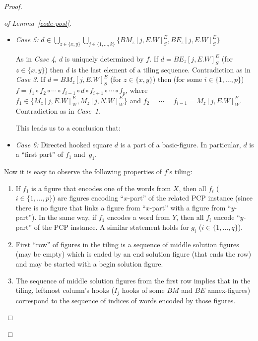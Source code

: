 \documentclass[final,nomarks]{dmtcs-episciences}
\newcommand{\NN}[1]{\{1,\ldots,#1\}}
\begin{document}
\begin{proof}
\begin{proof}[of Lemma~\ref{code-post}]
\begin{itemize}
Now $d$ must be the first one in the tiling since it has the
start point at its north side and it is the northernmost in the
tiling. Observe that there exists no square with $e$-hook at the
north side. Hence $BM_z[j,E.W]^N_E$ and $BE_z[j,E.W]^N_E$
($z\in\{x,y\}$) cannot be the first elements of two different
tiling sequences of $f$. Consequently, $d$ is uniquely
determined by $f$ and $d=f_1=g_1$. Contradiction as in
\emph{Case~2}.

\item\emph{Case 5:}
$d\in\bigcup_{z\in\{x,y\}}\bigcup_{j\in\NN{k}}\{
	BM_z[j,E.W]^E_S,
	BE_z[j,E.W]^E_S
\}$

As in \emph{Case 4}, $d$ is uniquely determined by $f$. If
$d=BE_z[j,E.W]^E_S$ (for $z\in\{x,y\}$) then $d$ is the last
element of a tiling sequence. Contradiction as in \emph{Case 3}.
If $d=BM_z[j,E.W]^E_S$ (for $z\in\{x,y\}$) then (for some
$i\in\NN{p}$) $f=f_1\circ f_2\circ\cdots\circ f_{i-1}\circ
d\circ f_{i+1}\circ\cdots\circ f_p$, where
$f_1\in\{M_z[j,E.W]^E_W,M_z[j,N.W]^E_W\}$ and
$f_2=\cdots=f_{i-1}=M_z[j,E.W]^E_W$. Contradiction as in
\emph{Case~1}.

This leads us to a conclusion that:

\item\emph{Case 6:} Directed hooked square $d$ is a part of a
basic-figure. In particular, $d$ is a ``first part'' of $f_1$
and~$g_1$.

\end{itemize}

Now it is easy to observe the following properties of $f$'s tiling:
\begin{enumerate}

\item If $f_1$ is a figure that encodes one of the words from $X$,
then all $f_i$ ($i\in\NN{p}$) are figures encoding
``$x$-part'' of the related PCP instance (since there is no figure
that links a figure from ``$x$-part'' with a
figure from ``$y$-part''). In the same way, if $f_1$ encodes a word
from $Y$, then all $f_i$ encode ``$y$-part'' of the
PCP instance. A similar statement holds for $g_i$ ($i\in\NN{q}$).

\item First ``row'' of figures in the tiling is a sequence of middle
solution figures (may be empty) which is ended by
an end solution figure (that ends the row) and may be started with a
begin solution figure.

\item The sequence of middle solution figures from the first row
implies that in the tiling, leftmost column's hooks ($I_j$ hooks
of some $BM$ and $BE$ annex-figures) correspond to the sequence
of indices of words encoded by those figures.


\end{enumerate}
\end{proof}
\end{proof}
\end{document}
